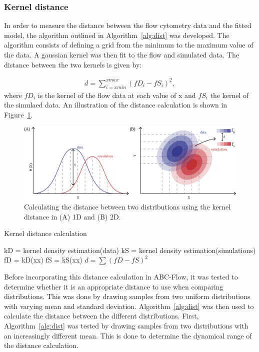 \label{sec:dist}
\subsubsection{Kernel distance}
\label{sec:dist_kernel}
In order to measure the distance between the flow cytometry data and the fitted model, the algorithm outlined in Algorithm~\ref{alg:dist} was developed. The algorithm consists of defining a grid from the minimum to the maximum value of the data. A gaussian kernel was then fit to the flow and simulated data. The distance between the two kernels is given by:

\begin{align*}%
	d = \sum_{i=xmin}^{xmax} (fD_i - fS_i)^2,
\end{align*}
where $fD_i$ is the kernel of the flow data at each value of x and $fS_i$ the kernel of the simulaed data. An illustration of the distance calculation is shown in Figure~\ref{fig:old_dist}.



\begin{figure}[tb]
\centering
\includegraphics[scale=0.8]{../../chapters/chapterABCFlow/images/old_distance.png}
\caption[Kernel distance]{\label{fig:old_dist}Calculating the distance between two distributions using the kernel distance in (A) 1D and (B) 2D. }
\end{figure}



\begin{algorithm}[tb]
\caption{Kernel distance calculation}
\label{alg:dist}
 \begin{algorithmic}[1]
    \Statex
	\State kD = kernel density estimation(data)
	\State kS = kernel density estimation(simulations)
	\State fD = kD(xx)
	\State fS = kS(xx)    
	\State $d = \sum(fD-fS)^2$
  \end{algorithmic}
\end{algorithm}

Before incorporating this distance calculation in ABC-Flow, it was tested to determine whether it is an appropriate distance to use when comparing distributions. This was done by drawing samples from two uniform distributions with varying mean and standard deviation. Algorithm~\ref{alg:dist} was then used to calculate the distance between the different distributions. First, Algorithm~\ref{alg:dist} was tested by drawing samples from two distributions with an increasingly different mean. This is done to determine the dynamical range of the distance calculation.

